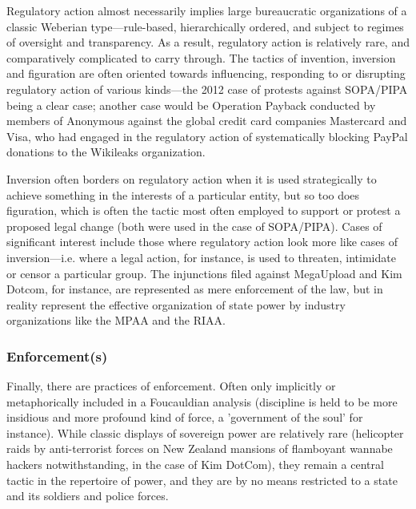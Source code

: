 \documentclass[10pt,letter,oneside]{scrartcl}
\begin{document}
Regulatory action almost necessarily implies large bureaucratic organizations of
a classic Weberian type---rule-based, hierarchically ordered, and subject to
regimes of oversight and transparency.  As a result, regulatory action is
relatively rare, and comparatively complicated to carry through.  The tactics of
invention, inversion and figuration are often oriented towards influencing,
responding to or disrupting regulatory action of various kinds---the 2012 case
of protests against SOPA/PIPA being a clear case; another case would be
Operation Payback conducted by members of Anonymous against the global credit
card companies Mastercard and Visa, who had engaged in the regulatory action of
systematically blocking PayPal donations to the Wikileaks organization.


Inversion often borders on regulatory action when it is used strategically to
achieve something in the interests of a particular entity, but so too does
figuration, which is often the tactic most often employed to support or protest
a proposed legal change (both were used in the case of SOPA/PIPA).  Cases of
significant interest include those where regulatory action look more like cases
of inversion---i.e. where a legal action, for instance, is used to threaten,
intimidate or censor a particular group. The injunctions filed against
MegaUpload and Kim Dotcom, for instance, are represented as mere enforcement of
the law, but in reality represent the effective organization of state power by
industry organizations like the MPAA and the RIAA.

\subsubsection{Enforcement(s)}

Finally, there are practices of enforcement. Often only implicitly or
metaphorically included in a Foucauldian analysis (discipline is held to be
more insidious and more profound kind of force, a 'government of the soul' for
instance).  While classic displays of sovereign power are relatively rare
(helicopter raids by anti-terrorist forces on New Zealand mansions of
flamboyant wannabe hackers notwithstanding, in the case of Kim DotCom), they
remain a central tactic in the repertoire of power, and they are by no means
restricted to a state and its soldiers and police forces. 
\end{document}
